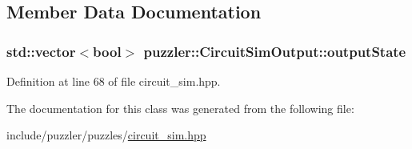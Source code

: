 \subsection{Member Data Documentation}
\hypertarget{a00004_ac8cb4373d4a1fb54dca1a3abcfb7cc90}{}
\subsubsection[{output\+State}]{\setlength{\rightskip}{0pt plus 5cm}std\+::vector$<$bool$>$ puzzler\+::\+Circuit\+Sim\+Output\+::output\+State}\label{a00004_ac8cb4373d4a1fb54dca1a3abcfb7cc90}


Definition at line 68 of file circuit\+\_\+sim.\+hpp.



The documentation for this class was generated from the following file\+:\begin{DoxyCompactItemize}
\item 
include/puzzler/puzzles/\hyperlink{a00129}{circuit\+\_\+sim.\+hpp}\end{DoxyCompactItemize}

